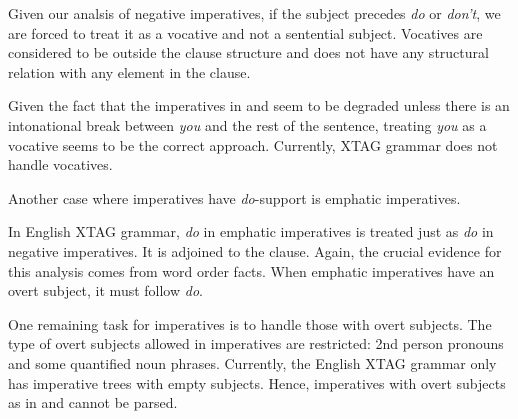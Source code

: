 Given our analsis of negative imperatives, if the subject precedes {\it do}
or {\it don't}, we are forced to treat it as a vocative and not a
sentential subject.  Vocatives are considered to be outside the clause
structure and does not have any structural relation with any element in the
clause.


Given the fact that the imperatives in  and  seem to be
degraded unless there is an intonational break between {\it you} and the
rest of the sentence, treating {\it you} as a vocative seems to be the
correct approach.  Currently, XTAG grammar does not handle vocatives.
  

Another case where imperatives have {\it do}-support is emphatic
imperatives.


In English XTAG grammar, {\it do} in emphatic imperatives is treated just
as {\it do} in negative imperatives.  It is adjoined to the clause.  Again,
the crucial evidence for this analysis comes from word order facts.  When
emphatic imperatives have an overt subject, it must follow {\it do}.


One remaining task for imperatives is to handle those with overt subjects.
The type of overt subjects allowed in imperatives are restricted: 2nd
person pronouns and some quantified noun phrases. Currently, the English
XTAG grammar only has imperative trees with empty subjects.  Hence,
imperatives with overt subjects as in  and  cannot be parsed.

% 
% 

